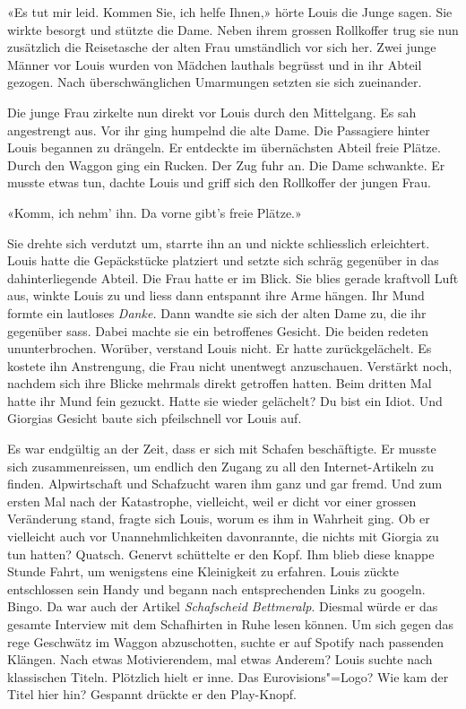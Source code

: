 «Es tut mir leid. Kommen Sie, ich helfe Ihnen,» hörte Louis die Junge
sagen. Sie wirkte besorgt und stützte die Dame. Neben ihrem grossen
Rollkoffer trug sie nun zusätzlich die Reisetasche der alten Frau
umständlich vor sich her. Zwei junge Männer vor Louis wurden von Mädchen
lauthals begrüsst und in ihr Abteil gezogen. Nach überschwänglichen
Umarmungen setzten sie sich zueinander.

Die junge Frau zirkelte nun direkt vor Louis durch den Mittelgang. Es
sah angestrengt aus. Vor ihr ging humpelnd die alte Dame. Die
Passagiere hinter Louis begannen zu drängeln. Er entdeckte im
übernächsten Abteil freie Plätze. Durch den Waggon ging ein Rucken. Der
Zug fuhr an. Die Dame schwankte. Er musste etwas tun, dachte Louis und 
griff sich den Rollkoffer der jungen Frau.

«Komm, ich nehm’ ihn. Da vorne gibt’s freie Plätze.»

Sie drehte sich verdutzt um, starrte ihn an und nickte schliesslich erleichtert.
Louis hatte die Gepäckstücke
platziert und setzte sich schräg gegenüber in das dahinterliegende Abteil. 
Die Frau hatte er im Blick. Sie blies gerade kraftvoll Luft aus, winkte
Louis zu und liess dann entspannt ihre Arme hängen. Ihr Mund formte ein
lautloses \emph{Danke.}
Dann wandte sie sich der alten Dame zu, die ihr gegenüber sass. Dabei
machte sie ein betroffenes Gesicht. Die beiden redeten ununterbrochen.
Worüber, verstand Louis nicht. Er hatte zurückgelächelt.
Es kostete ihn Anstrengung, die Frau nicht unentwegt anzuschauen. 
Verstärkt noch, nachdem sich ihre Blicke mehrmals direkt getroffen
hatten. Beim dritten Mal hatte ihr Mund fein gezuckt. Hatte sie wieder gelächelt? 
Du bist ein Idiot. Und Giorgias Gesicht baute sich pfeilschnell vor Louis auf. 

Es war endgültig an der Zeit, dass er sich mit Schafen beschäftigte. Er
musste sich zusammenreissen, um endlich den Zugang zu all den Internet-Artikeln
zu finden. Alpwirtschaft und Schafzucht waren ihm ganz und gar fremd. Und zum ersten Mal nach der Katastrophe, vielleicht,
weil er dicht vor einer grossen Veränderung stand, fragte sich Louis,
worum es ihm in Wahrheit ging. Ob er vielleicht auch vor
Unannehmlichkeiten davonrannte, die nichts mit Giorgia zu tun hatten?
Quatsch. Genervt schüttelte er den Kopf. Ihm blieb diese knappe Stunde Fahrt, um wenigstens eine Kleinigkeit zu
erfahren. Louis zückte entschlossen sein Handy und begann nach entsprechenden
Links zu googeln. Bingo. Da war auch der Artikel \emph{Schafscheid
Bettmeralp}. Diesmal würde er das gesamte Interview mit dem Schafhirten
in Ruhe lesen können. Um sich gegen das rege Geschwätz im Waggon
abzuschotten, suchte er auf Spotify nach passenden Klängen. Nach etwas
Motivierendem, mal etwas Anderem? 
Louis suchte nach klassischen Titeln. Plötzlich hielt er inne. Das
Euro\-visions"=Logo? Wie kam der Titel hier hin? Gespannt drückte er den
Play-Knopf.

